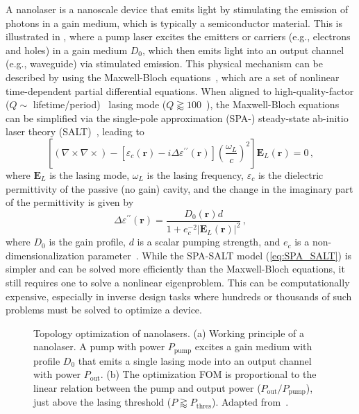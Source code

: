 A nanolaser is a nanoscale device that emits light by stimulating the emission of photons in a gain medium, which is typically a semiconductor material. This is illustrated
in , where a pump laser excites the emitters or carriers (e.g., electrons and holes) in a gain medium $D_0$, which then emits light into an output channel (e.g., waveguide) via
stimulated emission. This physical
mechanism can be described by using the Maxwell-Bloch equations~\cite{haken_laser_dynamics, PhysRev.134.A1429, SALT_original}, which are a set of nonlinear time-dependent 
partial differential equations. When aligned to high-quality-factor ($Q \sim$ lifetime/period)~\cite{phot_crys} lasing mode ($Q\gtrapprox 100$~\cite{cerjan_2016}), the Maxwell-Bloch equations can be simplified via the single-pole approximation (SPA-) steady-state ab-initio laser theory (SALT)~\cite{Ge_2010}, leading to
\begin{equation}\label{eq:SPA_SALT}
    \left[(\nabla \times 
     \nabla \times ) -\left[\varepsilon_c(\mathbf{r})-i \Delta \varepsilon^{\prime \prime} (\mathbf{r})\right] \left(\frac{\omega_L}{c}\right)^2\right] \mathbf{E}_L(\mathbf{r})=0\,,
\end{equation}
where $\mathbf{E}_L$ is the lasing mode, $\omega_L$ is the lasing frequency, $\varepsilon_c$ is the dielectric permittivity of the passive (no gain) cavity, and the change in the 
imaginary part of the permittivity is given by
\begin{equation}\label{eq:gain_SALT}
        \Delta \varepsilon^{\prime \prime} (\mathbf{r}) =  \frac{D_0(\mathbf{r}) d}{1+ e_c^{-2}\left|\mathbf{E}_L(\mathbf{r})\right|^2}\,,
\end{equation}
where $D_0$ is the gain profile, $d$ is a scalar pumping strength, and $e_c$ is a non-dimensionalization parameter~\cite{Ge_2010}. While the SPA-SALT model (\eqref{eq:SPA_SALT}) 
is simpler and can be solved more efficiently than the Maxwell-Bloch equations, it still requires one to solve a nonlinear eigenproblem. This can be computationally expensive, especially in 
inverse design tasks where hundreds or thousands of such problems must be solved to optimize a device.

\begin{figure}[tb]
    \centering
    \caption{Topology optimization of nanolasers. (a) Working principle of a nanolaser. A pump with power $P_\text{pump}$ excites a gain medium with profile
    $D_0$ that emits a single lasing mode into an output channel with power $P_\text{out}$. (b) The optimization FOM is proportional to the linear relation between the pump and output power ($P_\text{out}/P_\text{pump}$),
    just above the lasing threshold ($P \gtrapprox P_\text{thres}$).  Adapted from~\cite{ownpub4}.}
    \label{fig:laser2d}
\end{figure}

